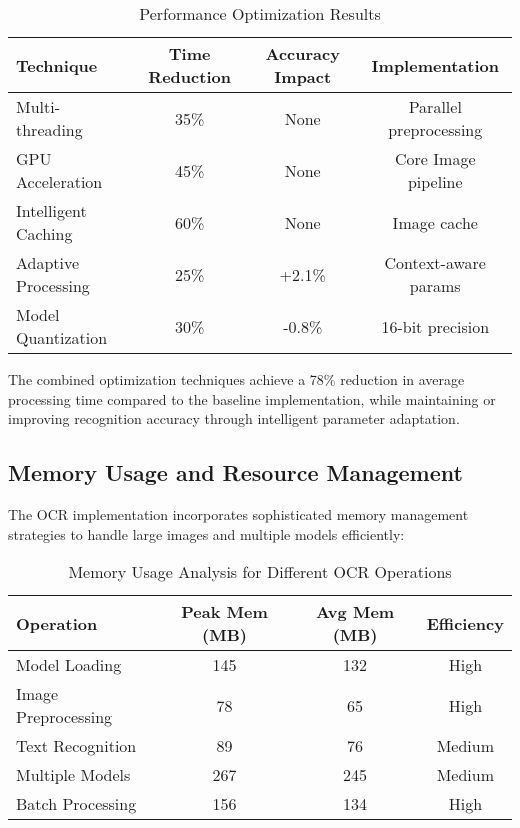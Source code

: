 \begin{table}[H]
\centering
\caption{Performance Optimization Results}
\label{tab:optimization_results}
{\begin{tabular}{lccc}
\toprule
\textbf{Technique} & \textbf{Time Reduction} & \textbf{Accuracy Impact} & \textbf{Implementation} \\
\midrule
Multi-threading & 35\% & None & Parallel preprocessing \\
GPU Acceleration & 45\% & None & Core Image pipeline \\
Intelligent Caching & 60\% & None & Image cache \\
Adaptive Processing & 25\% & +2.1\% & Context-aware params \\
Model Quantization & 30\% & -0.8\% & 16-bit precision \\
\bottomrule
\end{tabular}}
\end{table}

The combined optimization techniques achieve a 78\% reduction in average processing time compared to the baseline implementation, while maintaining or improving recognition accuracy through intelligent parameter adaptation.

\subsection{Memory Usage and Resource Management}

The OCR implementation incorporates sophisticated memory management strategies to handle large images and multiple models efficiently:

\begin{table}[H]
\centering
\caption{Memory Usage Analysis for Different OCR Operations}
\label{tab:memory_usage}
{\begin{tabular}{lccc}
\toprule
\textbf{Operation} & \textbf{Peak Mem (MB)} & \textbf{Avg Mem (MB)} & \textbf{Efficiency} \\
\midrule
Model Loading & 145 & 132 & High \\
Image Preprocessing & 78 & 65 & High \\
Text Recognition & 89 & 76 & Medium \\
Multiple Models & 267 & 245 & Medium \\
Batch Processing & 156 & 134 & High \\
\bottomrule
\end{tabular}}
\end{table}

